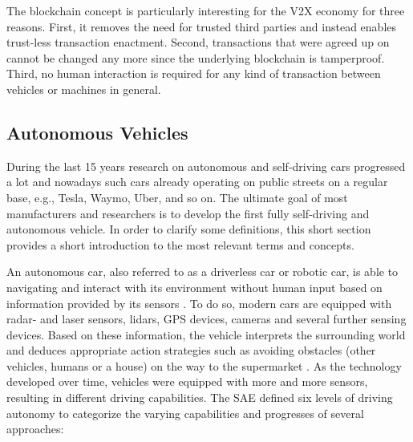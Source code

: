 \documentclass{llncs}
\begin{document}
{			The blockchain concept is particularly interesting for the V2X economy for three reasons. First, it removes the need for trusted third parties and instead enables trust-less transaction enactment. Second, transactions that were agreed up on cannot be changed any more since the underlying blockchain is tamperproof. Third, no human interaction is required for any kind of transaction between vehicles or machines in general.

		
		\subsection{Autonomous Vehicles}
			\label{ss:autonomous-vehicles}
			
			During the last 15 years research on autonomous and self-driving cars progressed a lot and nowadays such cars already operating on public streets on a regular base, e.g., Tesla, Waymo, Uber, and so on. The ultimate goal of most manufacturers and researchers is to develop the first fully self-driving and autonomous vehicle. In order to clarify some definitions, this short section provides a short introduction to the most relevant terms and concepts.

			An autonomous car, also referred to as a driverless car or robotic car, is able to navigating and interact with its environment without human input based on information provided by its sensors \cite{gehrig1999dead}\cite{thrun2010toward}. To do so, modern cars are equipped with radar- and laser sensors, lidars, GPS devices, cameras and several further sensing devices. Based on these information, the vehicle interprets the surrounding world and deduces appropriate action strategies such as avoiding obstacles (other vehicles, humans or a house) on the way to the supermarket \cite{dokic2015european}\cite{zhu2014vehicle}. As the technology developed over time, vehicles were equipped with more and more sensors, resulting in different driving capabilities. The SAE \cite{autonomyLevelsSAE}
			defined six levels of driving autonomy to categorize the varying capabilities and progresses of several approaches:		
			
}
\end{document}
